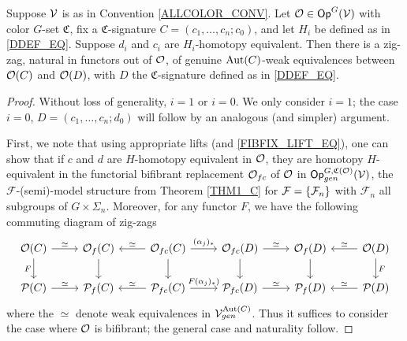 \documentclass[a4paper,10pt
,draft
]{article}%
\renewcommand{\F}{\mathcal F}
\renewcommand{\1}{\eta}%
\begin{document}
\begin{proposition}
      \label{CAV_4.14_PROP2}
      Suppose $\mathcal V$ is as in Convention \ref{ALLCOLOR_CONV}. %
      Let $\mathcal{O} \in \mathsf{Op}^G(\mathcal V)$ with color $G$-set $\mathfrak C$,
      fix a $\mathfrak C$-signature $C = (c_1,\dots, c_n;c_0)$,
      and let $H_i$ be defined as in \eqref{DDEF_EQ}.
      Suppose $d_i$ and $c_i$ are $H_i$-homotopy equivalent.
      Then there is a zig-zag, natural in functors out of $\mathcal{O}$,
      of genuine $\operatorname{Aut}(C)$-weak equivalences between $\mathcal{O}(C)$ and $\mathcal{O}(D)$,
      with $D$ the $\mathfrak C$-signature defined as in \eqref{DDEF_EQ}.
\end{proposition}
\begin{proof}
      Without loss of generality, $i = 1$ or $i = 0$.
      We only consider $i=1$; the case $i = 0$, $D = (c_1, \dots, c_n; d_0)$ will follow by an analogous (and simpler) argument.

      First, we note that using appropriate lifts (and \eqref{FIBFIX_LIFT_EQ}), one can show that if $c$ and $d$ are $H$-homotopy equivalent in $\mathcal{O}$, they are
      homotopy $H$-equivalent in the functorial bifibrant replacement $\mathcal{O}_{fc}$ of $\mathcal{O}$ in $\mathsf{Op}^{G, \mathfrak C(\mathcal{O})}_{gen}(\mathcal V)$,
      the $\F$-(semi)-model structure from Theorem \ref{THM1_C} for $\F = \set{\F_n}$ with $\F_n$ all subgroups of $G \times \Sigma_n$.
      Moreover, for any functor $F$, we have the following commuting diagram of zig-zags
      \begin{equation}
            \begin{tikzcd}
                  \O(C) \arrow[r, "\simeq"] \arrow[d, "F"']
                  &
                  \O_f(C) \arrow[d]
                  &
                  \O_{fc}(C) \arrow[l, "\simeq"'] \arrow[r, "{(\alpha_j)_{\**}}"] \arrow[d]
                  &
                  \O_{fc}(D) \arrow[r, "\simeq"] \arrow[d]
                  &
                  \O_f(D) \arrow[d]
                  &
                  \O(D) \arrow[l, "\simeq"'] \arrow[d, "F"]
                  \\
                  \P(C) \arrow[r, "\simeq"]
                  &
                  \P_f(C)
                  &
                  \P_{fc}(C) \arrow[l, "\simeq"'] \arrow[r, "{F(\alpha_j)_{\**})}"]
                  &
                  \P_{fc}(D) \arrow[r, "\simeq"] 
                  &
                  \P_f(D) 
                  &
                  \P(D) \arrow[l, "\simeq"']
            \end{tikzcd}
      \end{equation}
      where the $\simeq$ denote weak equivalences in $\mathcal V^{\operatorname{Aut}(C)}_{gen}$.
      Thus it suffices to consider the case where $\mathcal{O}$ is bifibrant; the general case and naturality follow.


\end{proof}
\end{document}

